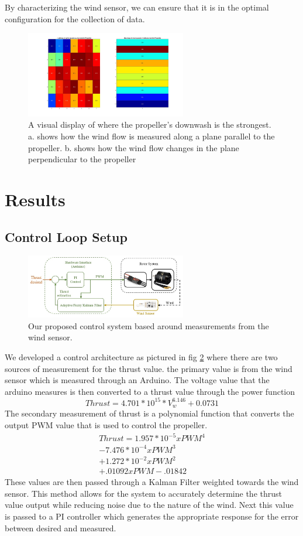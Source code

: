 \documentclass[conference]{IEEEtran}
\begin{document}
By characterizing the wind sensor, we can ensure that it is in the optimal configuration for the collection of data.
	\begin{figure}[htbp]
	\includegraphics[width=7cm]{images/figure_1/comb_heatmap.jpg}
	\caption{A visual display of where the propeller's downwash is the strongest. a. shows how the wind flow is measured along a plane parallel to the propeller. b. shows how the wind flow changes in the plane perpendicular to the propeller}
	\label{area}
\end{figure}

\section{Results}
\subsection{Control Loop Setup}
	\begin{figure}[htbp]
	\includegraphics[width=7cm]{images/Figure_2/Block_Diagram.jpg}
	\caption{Our proposed control system based around measurements from the wind sensor.}
	\label{block_diagram}
\end{figure}
We developed a control architecture as pictured in fig \ref{block_diagram} where there are two sources of measurement for the thrust value. the primary value is from the wind sensor which is measured through an Arduino. The voltage value that the arduino measures is then converted to a thrust value through the power function
\begin{equation}
Thrust = 4.701 * 10^{15} * V_w^{6.146} + 0.0731
\label{wind_power}
\end{equation}
The secondary measurement of thrust is a polynomial function that converts the output PWM value that is used to control the propeller. \newline
\begin{eqnarray}
Thrust = 1.957*10^{-5}xPWM^4 \\
- 7.476*10^{-4}xPWM^3 \nonumber\\ 
+ 1.272*10^{-2}xPWM^2 \nonumber\\
+ .01092xPWM - .01842 \nonumber
\label{pwm_poly}
\end{eqnarray}
These values are then passed through a Kalman Filter weighted towards the wind sensor. This method allows for the system to accurately determine the thrust value output while reducing noise due to the nature of the wind. Next this value is passed to a PI controller which generates the appropriate response for the error between desired and measured. 
\end{document}
